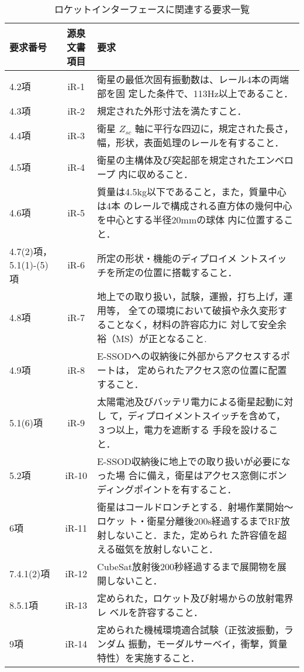 \begin{table}[htb]
    \centering
    \caption{ロケットインターフェースに関連する要求一覧}
    \begin{tabular}{|p{1.7cm}|c|p{10cm}|} \hline
        要求番号 & 源泉文書項目 & 要求 \\ \hline
        4.2項 & iR-1 & 衛星の最低次固有振動数は、レール4本の両端部を固
        定した条件で、113Hz以上であること． \\ \hline
        4.3項 & iR-2 & 規定された外形寸法を満たすこと． \\ \hline
        4.4項 & iR-3 & 衛星 $Z_{sc}$ 軸に平行な四辺に，規定された長さ，
        幅，形状，表面処理のレールを有すること． \\ \hline
        4.5項 & iR-4 & 衛星の主構体及び突起部を規定されたエンベロープ
        内に収めること．
        \\ \hline
        4.6項 & iR-5 & 質量は4.5kg以下であること，また，質量中心は4本
        のレールで構成される直方体の幾何中心を中心とする半径20mmの球体
        内に位置すること． \\ \hline
        4.7(2)項，5.1(1)-(5)項 & iR-6 & 所定の形状・機能のディプロイメ
        ントスイッチを所定の位置に搭載すること．\\ \hline
        4.8項 & iR-7 & 地上での取り扱い，試験，運搬，打ち上げ，運用等，
        全ての環境において破損や永久変形することなく，材料の許容応力に
        対して安全余裕（MS）が正となること. \\ \hline
        4.9項 & iR-8 & E-SSODへの収納後に外部からアクセスするポートは，
        定められたアクセス窓の位置に配置すること．\\ \hline
        5.1(6)項 & iR-9 & 太陽電池及びバッテリ電力による衛星起動に対し
        て，ディプロイメントスイッチを含めて，３つ以上，電力を遮断する
        手段を設けること．\\ \hline
        5.2項 & iR-10 & E-SSOD収納後に地上での取り扱いが必要になった場
        合に備え，衛星はアクセス窓側にボンディングポイントを有すること．
        \\ \hline
        6項 & iR-11 & 衛星はコールドロンチとする．射場作業開始～ロケッ
        ト・衛星分離後200s経過するまでRF放射しないこと．また，定められ
        た許容値を超える磁気を放射しないこと．\\ \hline
        7.4.1(2)項 & iR-12 & CubeSat放射後200秒経過するまで展開物を展開しないこと．
        \\ \hline
        8.5.1項 & iR-13 & 定められた，ロケット及び射場からの放射電界レ
        ベルを許容すること．\\ \hline
        9項 & iR-14 & 定められた機械環境適合試験（正弦波振動，ランダム
          振動，モーダルサーベイ，衝撃，質量特性）を実施すること．
        \\ \hline
    \end{tabular}
    \label{requirment_interface}
\end{table}

